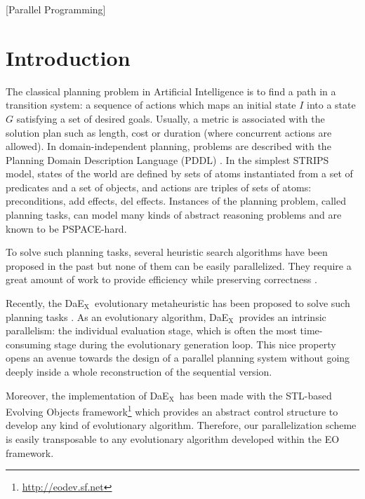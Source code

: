 \documentclass{sig-alternate}
\newcommand{\DAEX}{{\sc DaE$_{\text{X}}$}}
\begin{document}
[Parallel Programming]

\section{Introduction}
The classical planning problem in Artificial Intelligence \cite{gnt04} is to find a path in a transition system: a sequence of actions which maps an initial
state $I$ into a state $G$ satisfying a set of desired goals. Usually, a metric is associated with the solution plan such as length, cost or duration (where
concurrent actions are allowed). In domain-independent planning, problems are described with the Planning Domain Description Language (PDDL) \cite{pddl:jair2003}. 
In the simplest STRIPS model, states of the world are defined by sets of atoms instantiated from a set of predicates and a set of
objects, and actions are triples of sets of atoms: preconditions, add effects, del effects. 
Instances of the planning problem, called planning tasks, can model many kinds of abstract reasoning problems and are known to be PSPACE-hard.

To solve such planning tasks, several heuristic search algorithms have been proposed in the past but none of them can be easily parallelized.
They require a great amount of work to provide efficiency while preserving correctness \cite{burns:JAIR2010,burns:ijcai2009}.

Recently, the \DAEX\ evolutionary metaheuristic has been proposed to solve such planning tasks \cite{dae:icaps2010,dae:evocop2006}.
As an evolutionary algorithm, \DAEX\ provides an intrinsic parallelism: the individual evaluation stage, which is often the most time-consuming stage during the evolutionary generation loop.
This nice property opens an avenue towards the design of a parallel planning system without going deeply inside a whole reconstruction of the sequential version.

Moreover, the implementation of \DAEX\ has been made with the STL-based Evolving
Objects framework\footnote{\url{http://eodev.sf.net}} which provides an abstract
control structure to develop any kind of evolutionary algorithm. Therefore, our
parallelization scheme is easily transposable to any evolutionary algorithm
developed within the EO framework.
\end{document}
